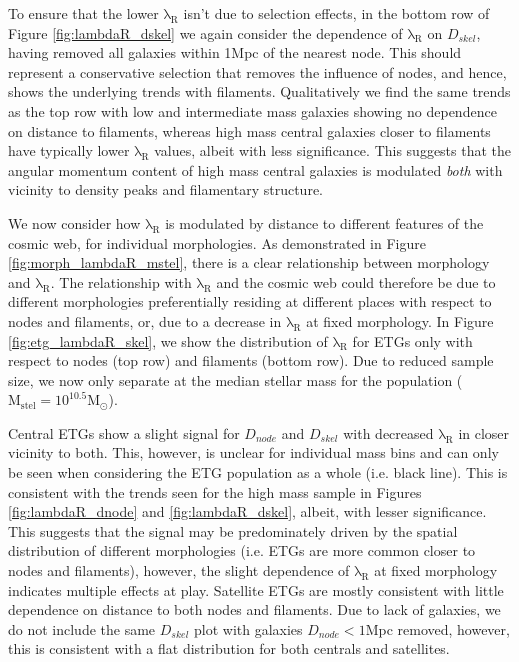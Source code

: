 To ensure that the lower $\mathrm{\lambda_R}$ isn't due to selection effects, in the bottom row of Figure \ref{fig:lambdaR_dskel} we again consider the dependence of $\mathrm{\lambda_R}$ on $D_{skel}$, having removed all galaxies within 1Mpc of the nearest node. This should represent a conservative selection that removes the influence of nodes, and hence, shows the underlying trends with filaments. Qualitatively we find the same trends as the top row with low and intermediate mass galaxies showing no dependence on distance to filaments, whereas high mass central galaxies closer to filaments have typically lower $\mathrm{\lambda_R}$ values, albeit with less significance. This suggests that the angular momentum content of high mass central galaxies is modulated \textit{both} with vicinity to density peaks and filamentary structure. 

We now consider how $\mathrm{\lambda_R}$ is modulated by distance to different features of the cosmic web, for individual morphologies. As demonstrated in Figure \ref{fig:morph_lambdaR_mstel}, there is a clear relationship between morphology and $\mathrm{\lambda_R}$. The relationship with $\mathrm{\lambda_R}$ and the cosmic web could therefore be due to different morphologies preferentially residing at different places with respect to nodes and filaments, or, due to a decrease in $\mathrm{\lambda_R}$ at fixed morphology. In Figure \ref{fig:etg_lambdaR_skel}, we show the distribution of $\mathrm{\lambda_R}$ for ETGs only with respect to nodes (top row) and filaments (bottom row). Due to reduced sample size, we now only separate at the median stellar mass for the population ($\mathrm{M_{stel} = 10^{10.5}M_{\odot}}$). 

Central ETGs show a slight signal for $D_{node}$ and $D_{skel}$ with decreased $\mathrm{\lambda_R}$ in closer vicinity to both. This, however, is unclear for individual mass bins and can only be seen when considering the ETG population as a whole (i.e. black line). This is consistent with the trends seen for the high mass sample in Figures \ref{fig:lambdaR_dnode} and \ref{fig:lambdaR_dskel}, albeit, with lesser significance. This suggests that the signal may be predominately driven by the spatial distribution of different morphologies (i.e. ETGs are more common closer to nodes and filaments), however, the slight dependence of $\mathrm{\lambda_R}$ at fixed morphology indicates multiple effects at play. Satellite ETGs are mostly consistent with little dependence on distance to both nodes and filaments. Due to lack of galaxies, we do not include the same $D_{skel}$ plot with galaxies $D_{node} < 1$Mpc removed, however, this is consistent with a flat distribution for both centrals and satellites.

